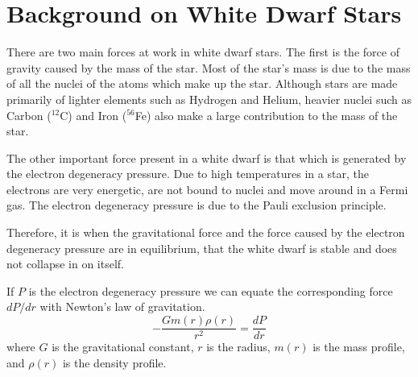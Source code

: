 \documentclass[a4paper]{IEEEtran}
\begin{document}

\section{Background on White Dwarf Stars}
There are two main forces at work in white dwarf stars. The first
is the force of gravity caused by the mass of the star. Most of the star's
mass is due to the mass of all the nuclei of the atoms which make up
the star. Although stars are made primarily of lighter elements such
as Hydrogen and Helium, heavier nuclei such as Carbon ($^{12}$C) and
Iron ($^{56}$Fe) also make a large contribution to the mass of the star.

The other important force present in a white dwarf is that which is
generated by the electron degeneracy pressure. Due to high temperatures
in a star, the electrons are very energetic, are not bound to nuclei
and move around in a Fermi gas. The electron degeneracy pressure 
is due to the Pauli exclusion principle.

Therefore, it is when the gravitational force and the force caused
by the electron degeneracy pressure are in equilibrium, that the
white dwarf is stable and does not collapse in on itself. 

If $P$ is the electron degeneracy pressure we can equate the corresponding
force $dP/dr$ with Newton's law of gravitation.
\begin{equation}
    -\frac{Gm(r)\rho(r)}{r^2} = \frac{dP}{dr}
\end{equation}
where $G$ is the gravitational constant, $r$ is the radius,
$m(r)$ is the mass profile, and $\rho(r)$ is the density profile.
\end{document}

